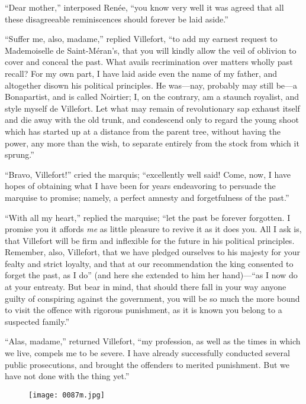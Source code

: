 “Dear mother,” interposed Renée, “you know very well it was agreed that
all these disagreeable reminiscences should forever be laid aside.”

“Suffer me, also, madame,” replied Villefort, “to add my earnest
request to Mademoiselle de Saint-Méran’s, that you will kindly allow
the veil of oblivion to cover and conceal the past. What avails
recrimination over matters wholly past recall? For my own part, I have
laid aside even the name of my father, and altogether disown his
political principles. He was—nay, probably may still be—a Bonapartist,
and is called Noirtier; I, on the contrary, am a staunch royalist, and
style myself de Villefort. Let what may remain of revolutionary sap
exhaust itself and die away with the old trunk, and condescend only to
regard the young shoot which has started up at a distance from the
parent tree, without having the power, any more than the wish, to
separate entirely from the stock from which it sprung.”

“Bravo, Villefort!” cried the marquis; “excellently well said! Come,
now, I have hopes of obtaining what I have been for years endeavoring
to persuade the marquise to promise; namely, a perfect amnesty and
forgetfulness of the past.”

“With all my heart,” replied the marquise; “let the past be forever
forgotten. I promise you it affords \textit{me} as little pleasure to revive
it as it does you. All I ask is, that Villefort will be firm and
inflexible for the future in his political principles. Remember, also,
Villefort, that we have pledged ourselves to his majesty for your
fealty and strict loyalty, and that at our recommendation the king
consented to forget the past, as I do” (and here she extended to him
her hand)—“as I now do at your entreaty. But bear in mind, that should
there fall in your way anyone guilty of conspiring against the
government, you will be so much the more bound to visit the offence
with rigorous punishment, as it is known you belong to a suspected
family.”

“Alas, madame,” returned Villefort, “my profession, as well as the
times in which we live, compels me to be severe. I have already
successfully conducted several public prosecutions, and brought the
offenders to merited punishment. But we have not done with the thing
yet.”

\begin{figure}[h]
\texttt{[image: 0087m.jpg]}
\end{figure}

